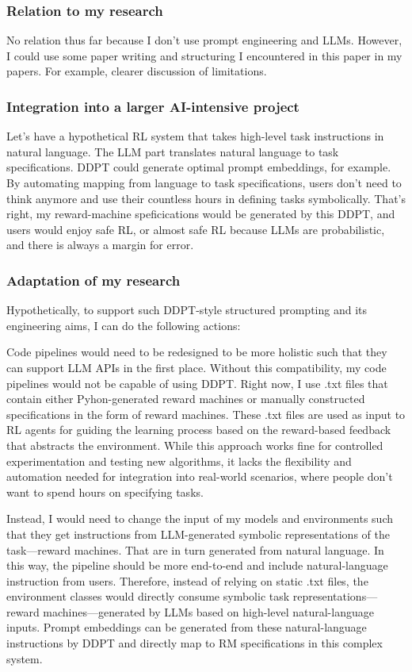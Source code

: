 \documentclass[a4paper,10pt]{article} %
\begin{document}
\subsubsection{Relation to my research}

No relation thus far because I don't use prompt engineering and LLMs.
However, I could use some paper writing and structuring I encountered in this paper in my papers.
For example, clearer discussion of limitations.

\subsubsection{Integration into a larger AI-intensive project}

Let's have a hypothetical RL system that takes high-level task instructions in natural language.
The LLM part translates natural language to task specifications.
DDPT could generate optimal prompt embeddings, for example.
By automating mapping from language to task specifications, users don't need to think anymore and use their countless hours in defining tasks symbolically.
That's right, my reward-machine speficications would be generated by this DDPT, and users would enjoy safe RL, or almost safe RL because LLMs are probabilistic, and there is always a margin for error.

\subsubsection{Adaptation of my research}

Hypothetically, to support such DDPT-style structured prompting and its engineering aims, I can do the following actions:

Code pipelines would need to be redesigned to be more holistic such that they can support LLM APIs in the first place.
Without this compatibility, my code pipelines would not be capable of using DDPT.
Right now, I use .txt files that contain either Pyhon-generated reward machines or manually constructed specifications in the form of reward machines.
These .txt files are used as input to RL agents for guiding the learning process based on the reward-based feedback that abstracts the environment.
While this approach works fine for controlled experimentation and testing new algorithms, it lacks the flexibility and automation needed for integration into real-world scenarios, where people don't want to spend hours on specifying tasks.

Instead, I would need to change the input of my models and environments such that they get instructions from LLM-generated symbolic representations of the task---reward machines.
That are in turn generated from natural language.
In this way, the pipeline should be more end-to-end and include natural-language instruction from users.
Therefore, instead of relying on static .txt files, the environment classes would directly consume symbolic task representations---reward machines---generated by LLMs based on high-level natural-language inputs.
Prompt embeddings can be generated from these natural-language instructions by DDPT and directly map to RM specifications in this complex system.
\end{document}
